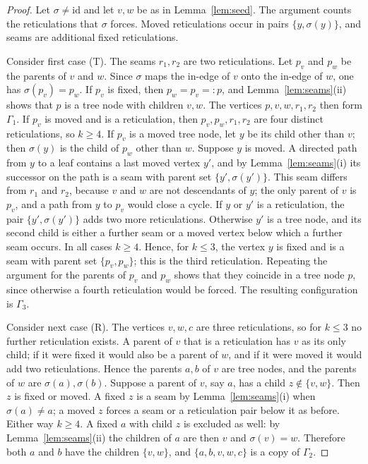 \documentclass[11pt,a4paper]{article}
\theoremstyle{definition}
\begin{document}
\begin{proof}
Let $\sigma\neq\mathrm{id}$ and let $v,w$ be as in Lemma~\ref{lem:seed}. The argument counts the reticulations that $\sigma$ forces. Moved reticulations occur in pairs $\{y,\sigma(y)\}$, and seams are additional fixed reticulations.

Consider first case (T). The seams $r_1,r_2$ are two reticulations. Let $p_v$ and $p_w$ be the parents of $v$ and $w$. Since $\sigma$ maps the in-edge of $v$ onto the in-edge of $w$, one has $\sigma(p_v)=p_w$. If $p_v$ is fixed, then $p_w=p_v=:p$, and Lemma~\ref{lem:seams}(ii) shows that $p$ is a tree node with children $v,w$. The vertices $p,v,w,r_1,r_2$ then form $\Gamma_1$. If $p_v$ is moved and is a reticulation, then $p_v,p_w,r_1,r_2$ are four distinct reticulations, so $k\ge4$. If $p_v$ is a moved tree node, let $y$ be its child other than $v$; then $\sigma(y)$ is the child of $p_w$ other than $w$. Suppose $y$ is moved. A directed path from $y$ to a leaf contains a last moved vertex $y'$, and by Lemma~\ref{lem:seams}(i) its successor on the path is a seam with parent set $\{y',\sigma(y')\}$. This seam differs from $r_1$ and $r_2$, because $v$ and $w$ are not descendants of $y$; the only parent of $v$ is $p_v$, and a path from $y$ to $p_v$ would close a cycle. If $y$ or $y'$ is a reticulation, the pair $\{y',\sigma(y')\}$ adds two more reticulations. Otherwise $y'$ is a tree node, and its second child is either a further seam or a moved vertex below which a further seam occurs. In all cases $k\ge4$. Hence, for $k\le3$, the vertex $y$ is fixed and is a seam with parent set $\{p_v,p_w\}$; this is the third reticulation. Repeating the argument for the parents of $p_v$ and $p_w$ shows that they coincide in a tree node $p$, since otherwise a fourth reticulation would be forced. The resulting configuration is $\Gamma_3$.

Consider next case (R). The vertices $v,w,c$ are three reticulations, so for $k\le3$ no further reticulation exists. A parent of $v$ that is a reticulation has $v$ as its only child; if it were fixed it would also be a parent of $w$, and if it were moved it would add two reticulations. Hence the parents $a,b$ of $v$ are tree nodes, and the parents of $w$ are $\sigma(a),\sigma(b)$. Suppose a parent of $v$, say $a$, has a child $z\notin\{v,w\}$. Then $z$ is fixed or moved. A fixed $z$ is a seam by Lemma~\ref{lem:seams}(i) when $\sigma(a)\neq a$; a moved $z$ forces a seam or a reticulation pair below it as before. Either way $k\ge4$. A fixed $a$ with child $z$ is excluded as well: by Lemma~\ref{lem:seams}(ii) the children of $a$ are then $v$ and $\sigma(v)=w$. Therefore both $a$ and $b$ have the children $\{v,w\}$, and $\{a,b,v,w,c\}$ is a copy of $\Gamma_2$.


\end{proof}
\end{document}
